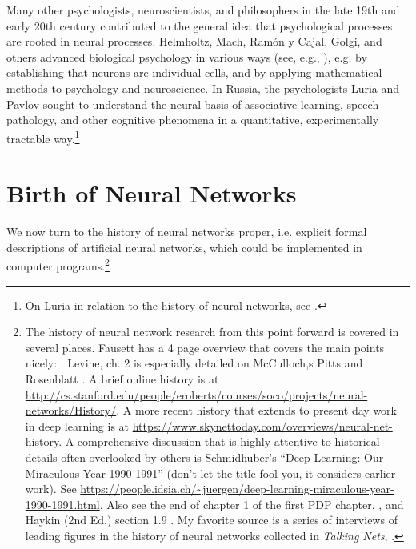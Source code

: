 Many other psychologists, neuroscientists, and philosophers in the late 19th and early 20th century contributed to the general idea that psychological processes are rooted in neural processes. Helmholtz, Mach, Ram{\'o}n y Cajal, Golgi, and others advanced biological psychology in various ways (see, e.g., \cite{boring1929history}), e.g. by establishing that neurons are individual cells, and by applying mathematical methods to psychology and neuroscience. In Russia, the psychologists Luria and Pavlov sought to understand the neural basis of associative learning, speech pathology, and other cognitive phenomena in a quantitative, experimentally tractable way.\footnote{On Luria in relation to the history of neural networks, see \cite[p. 41]{rumelhart1986parallel}.}

\section{Birth of Neural Networks}

We now turn to the history of neural networks proper, i.e. explicit formal descriptions of artificial neural networks, which could be implemented in computer programs.\footnote{The history of neural network research from this point forward is covered in several places. Fausett has a 4 page overview that covers the main points nicely: \cite[pp. 22-26]{fausett1994fundamentals}. Levine, ch. 2 is especially detailed on McCulloch,s Pitts and Rosenblatt \cite{levine2000introduction}. A brief online history is at \url{http://cs.stanford.edu/people/eroberts/courses/soco/projects/neural-networks/History/}. A more recent history that extends to present day work in deep learning is at \url{https://www.skynettoday.com/overviews/neural-net-history}. A comprehensive discussion that is highly attentive to historical details often overlooked by others is Schmidhuber's ``Deep Learning: Our Miraculous Year 1990-1991'' \cite{schmidhuber2020deep} (don't let the title fool you, it considers earlier work). See \url{https://people.idsia.ch/~juergen/deep-learning-miraculous-year-1990-1991.html}.  Also see the end of chapter 1 of the first PDP chapter, \cite{rumelhart1986parallel}, and Haykin (2nd Ed.) section 1.9 \cite{haykin1998neural}. My favorite source is a series of interviews of leading figures in the history of neural networks collected in \emph{Talking Nets}, \cite{anderson2000talking}.} 

